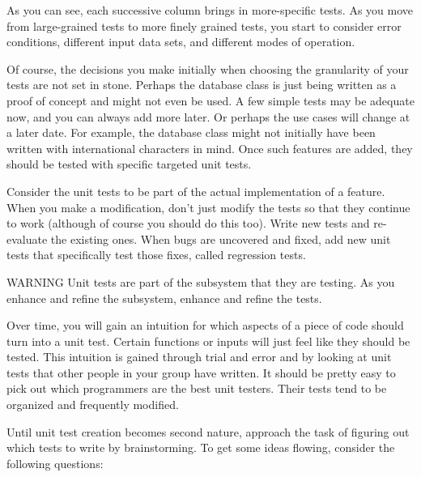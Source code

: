 As you can see, each successive column brings in more-specific tests. As you move from large-grained tests to more finely grained tests, you start to consider error conditions, different input data sets, and different modes of operation.

Of course, the decisions you make initially when choosing the granularity of your tests are not set in stone. Perhaps the database class is just being written as a proof of concept and might not even be used. A few simple tests may be adequate now, and you can always add more later. Or perhaps the use cases will change at a later date. For example, the database class might not initially have been written with international characters in mind. Once such features are added, they should be tested with specific targeted unit tests.

Consider the unit tests to be part of the actual implementation of a feature. When you make a modification, don’t just modify the tests so that they continue to work (although of course you should do this too). Write new tests and re-evaluate the existing ones. When bugs are uncovered and fixed, add new unit tests that specifically test those fixes, called regression tests.

\begin{myWarning}{WARNING}
Unit tests are part of the subsystem that they are testing. As you enhance and refine the subsystem, enhance and refine the tests.
\end{myWarning}


Over time, you will gain an intuition for which aspects of a piece of code should turn into a unit test. Certain functions or inputs will just feel like they should be tested. This intuition is gained through trial and error and by looking at unit tests that other people in your group have written. It should be pretty easy to pick out which programmers are the best unit testers. Their tests tend to be organized and frequently modified.

Until unit test creation becomes second nature, approach the task of figuring out which tests to write by brainstorming. To get some ideas flowing, consider the following questions:

